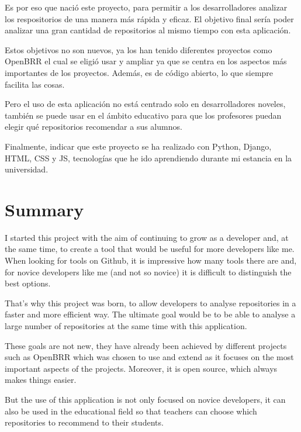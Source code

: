 \documentclass[a4paper, 12pt]{book}
\begin{document}
Es por eso que nació este proyecto, para permitir a los desarrolladores analizar los respositorios de una manera más rápida y eficaz. El objetivo final sería poder analizar una gran cantidad de repositorios al mismo tiempo con esta aplicación.

Estos objetivos no son nuevos, ya los han tenido diferentes proyectos como OpenBRR el cual se eligió usar y ampliar ya que se centra en los aspectos más importantes de los proyectos. Además, es de código abierto, lo que siempre facilita las cosas.

Pero el uso de esta aplicación no está centrado solo en desarrolladores noveles, también se puede usar en el ámbito educativo para que los profesores puedan elegir qué repositorios recomendar a sus alumnos. 

Finalmente, indicar que este proyecto se ha realizado con Python, Django, HTML, CSS  y JS, tecnologías que he ido aprendiendo durante mi estancia en la universidad.


\chapter*{Summary}

I started this project with the aim of continuing to grow as a developer and, at the same time, to create a tool that would be useful for more developers like me. When looking for tools on Github, it is impressive how many tools there are and, for novice developers like me (and not so novice) it is difficult to distinguish the best options.

That's why this project was born, to allow developers to analyse repositories in a faster and more efficient way. The ultimate goal would be to be able to analyse a large number of repositories at the same time with this application.

These goals are not new, they have already been achieved by different projects such as OpenBRR which was chosen to use and extend as it focuses on the most important aspects of the projects. Moreover, it is open source, which always makes things easier.

But the use of this application is not only focused on novice developers, it can also be used in the educational field so that teachers can choose which repositories to recommend to their students. 
\end{document}
